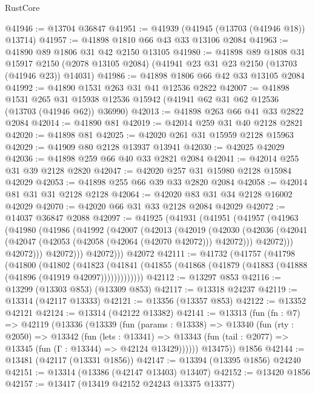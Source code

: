\begin{lexlean}{RustCore}
\begin{coremodule}
@41946 := @13704 @36847
@41951 := @41939 (@41945 (@13703 (@41946 @18)) @13714)
@41957 := @41898 @1810 @66 @43 @33 @13106 @2084
@41963 := @41890 @89 @1806 @31 @42 @2150 @13105
@41980 := @41898
    @89
    @1808
    @31
    @15917
    @2150
    (@2078 @13105 @2084)
    (@41941 @23 @31 @23 @2150 (@13703 (@41946 @23)) @14031)
@41986 := @41898 @1806 @66 @42 @33 @13105 @2084
@41992 := @41890 @1531 @263 @31 @41 @12536 @2822
@42007 := @41898
    @1531
    @265
    @31
    @15938
    @12536
    @15942
    (@41941 @62 @31 @62 @12536 (@13703 (@41946 @62)) @36990)
@42013 := @41898 @263 @66 @41 @33 @2822 @2084
@42014 := @41890 @81
@42019 := @42014 @259 @31 @40 @2128 @2821
@42020 := @41898 @81
@42025 := @42020 @261 @31 @15959 @2128 @15963
@42029 := @41909 @80 @2128 @13937 @13941
@42030 := @42025 @42029
@42036 := @41898 @259 @66 @40 @33 @2821 @2084
@42041 := @42014 @255 @31 @39 @2128 @2820
@42047 := @42020 @257 @31 @15980 @2128 @15984 @42029
@42053 := @41898 @255 @66 @39 @33 @2820 @2084
@42058 := @42014 @81 @31 @31 @2128 @2128
@42064 := @42020 @83 @31 @34 @2128 @16002 @42029
@42070 := @42020 @66 @31 @33 @2128 @2084 @42029
@42072 := @14037 @36847 @2088
@42097 := @41925
    (@41931
      (@41951
        (@41957
          (@41963
            (@41980
              (@41986
                (@41992
                  (@42007
                    (@42013
                      (@42019
                        (@42030
                          (@42036
                            (@42041 (@42047 (@42053 (@42058 (@42064 (@42070 @42072))) @42072)))
                            @42072)))
                      @42072)))
                @42072)))
          @42072)))
    @42072
@42111 := @41732
    (@41757
      (@41798
        (@41800
          (@41802
            (@41823
              (@41841 (@41855 (@41868 (@41879 (@41883 (@41888 (@41896 (@41919 @42097)))))))))))))
@42112 := @13297 @853
@42116 := @13299 (@13303 @853) (@13309 @853)
@42117 := @13318 @24237
@42119 := @13314 (@42117 @13333)
@42121 := @13356 (@13357 @853)
@42122 := @13352 @42121
@42124 := @13314 (@42122 @13382)
@42141 := @13313
    (fun (fn : @7) =>
    @42119
      (@13336
        (@13339
          (fun (params : @13338) =>
          @13340
            (fun (rty : @2050) =>
            @13342
              (fun (lets : @13341) =>
              @13343 (fun (tail : @2077) => @13345 (fun (Γ : @13344) => @42124 @13429))))))
        @13475))
    @1856
@42144 := @13481 (@42117 (@13331 @1856))
@42147 := @13394 (@13395 @1856) @24240
@42151 := @13314 (@13386 (@42147 @13403) @13407)
@42152 := @13420 @1856
@42157 := @13417 (@13419 @42152 @24243 @13375 @13377)

\end{coremodule}
\end{lexlean}
